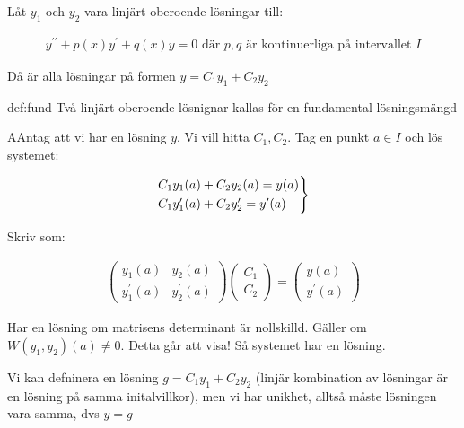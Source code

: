 \begin{theo}
  Låt $y_1$ och $y_2$ vara linjärt oberoende lösningar till:

  \begin{equation*}
    \begin{gathered}
      y^{\prime\prime}+p(x)y^{\prime}+q(x)y=0 \text{ där $p,q$ är kontinuerliga på intervallet $I$}
    \end{gathered}
  \end{equation*}
  \par\bigskip
  \noindent Då är alla lösningar på formen $y=C_1y_1+C_2y_2$
\end{theo}
\par\bigskip

\begin{theo}{def:fund}
  Två linjärt oberoende lösnignar kallas för en fundamental lösningsmängd
\end{theo}
\par\bigskip

\begin{prf}
  AAntag att vi har en lösning $y$. Vi vill hitta $C_1, C_2$. Tag en punkt $a\in I$ och lös systemet:

  \begin{equation*}
    \begin{gathered}
      \begin{rcases*}
        C_1y_1(a)+C_2y_2(a)=y(a)\\
        C_1y_{1}^{\prime}(a)+C_2y_{2}^{\prime}=y^{\prime}(a)
      \end{rcases*}
    \end{gathered}
  \end{equation*}
  \par\bigskip

  \noindent Skriv som:


  \begin{equation*}
    \begin{gathered}
      \begin{pmatrix}
        y_1(a)&y_2(a)\\
        y_1^{\prime}(a)&y_{2}^{\prime}(a)
      \end{pmatrix}
      \begin{pmatrix}
        C_1\\
        C_2
      \end{pmatrix}
      = \begin{pmatrix}y(a)\\y^{\prime}(a)\end{pmatrix}
    \end{gathered}
  \end{equation*}
  \par\bigskip

  \noindent Har en lösning om matrisens determinant är nollskilld. Gäller om $W(y_1,y_2)(a)\neq0$. Detta går att visa! Så systemet har en lösning.
  \par\bigskip
  \noindent Vi kan defninera en lösning $g= C_1y_1+C_2y_2$ (linjär kombination av lösningar är en lösning på samma initalvillkor), men vi har unikhet, alltså måste lösningen vara samma, dvs $y=g$
\end{prf}
\par\bigskip

